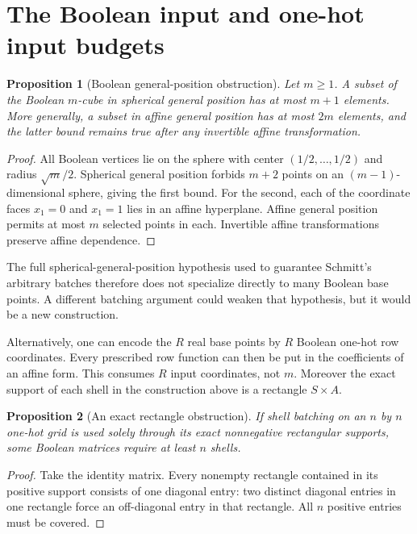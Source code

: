 \documentclass[11pt]{article}
\newtheorem{proposition}{Proposition}
\begin{document}
\section{The Boolean input and one-hot input budgets}

\begin{proposition}[Boolean general-position obstruction]
Let $m\ge1$. A subset of the Boolean $m$-cube in spherical general
position has at most $m+1$ elements. More generally, a subset in
affine general position has at most $2m$ elements, and the latter
bound remains true after any invertible affine transformation.
\end{proposition}

\begin{proof}
All Boolean vertices lie on the sphere with center
$(1/2,\ldots,1/2)$ and radius $\sqrt m/2$. Spherical general position
forbids $m+2$ points on an $(m-1)$-dimensional sphere, giving the first
bound. For the second, each of the coordinate faces $x_1=0$ and
$x_1=1$ lies in an affine hyperplane. Affine general position permits
at most $m$ selected points in each. Invertible affine transformations
preserve affine dependence.
\end{proof}

The full spherical-general-position hypothesis used to guarantee
Schmitt's arbitrary batches therefore does not specialize directly
to many Boolean base points. A different batching argument could
weaken that hypothesis, but it would be a new construction.

Alternatively, one can encode the $R$ real base points by $R$ Boolean
one-hot row coordinates. Every prescribed row function can then be
put in the coefficients of an affine form. This consumes $R$ input
coordinates, not $m$. Moreover the exact support of each shell in
the construction above is a rectangle $S\times A$.

\begin{proposition}[An exact rectangle obstruction]
If shell batching on an $n$ by $n$ one-hot grid is used solely through
its exact nonnegative rectangular supports, some Boolean matrices
require at least $n$ shells.
\end{proposition}

\begin{proof}
Take the identity matrix. Every nonempty rectangle contained in its
positive support consists of one diagonal entry: two distinct
diagonal entries in one rectangle force an off-diagonal entry in
that rectangle. All $n$ positive entries must be covered.
\end{proof}
\end{document}
